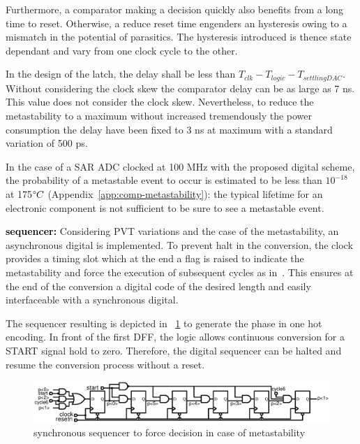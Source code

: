 Furthermore, a comparator making a decision quickly also benefits from a long time to reset. Otherwise, a reduce reset time engenders an hysteresis owing to a mismatch in the potential of parasitics. The hysteresis introduced is thence state dependant and vary from one clock cycle to the other. 

In the design of the latch, the delay shall be less than \(T_{clk} -  T_{logic} - T_{settlingDAC}\). Without considering the clock skew the comparator delay can be as large as 7 ns. This value does not consider the clock skew. Nevertheless, to reduce the metastability to a maximum without increased tremendously the power consumption the delay have been fixed to 3 ns at maximum with a standard variation of 500 ps.

In the case of a SAR ADC clocked at 100 MHz with the proposed digital scheme, the probability of a metastable event to occur is estimated to be less than $10^{-18}$ at 175$\degree C$ (Appendix~\ref{app:comp-metastability}): the typical lifetime for an electronic component is not sufficient to be sure to see a metastable event.

\textbf{\textcolor{black}{sequencer:}}
Considering PVT variations and the case of the metastability, an asynchronous digital is implemented. To prevent halt in the conversion, the clock provides a timing slot which at the end a flag is raised to indicate the metastability and force the execution of subsequent cycles as in~\cite{Tung2016}. This ensures at the end of the conversion a digital code of the desired length and easily interfaceable with a synchronous digital.

The sequencer resulting is depicted in \figurename~\ref{fig:sar-async-sequencer} to generate the phase in one hot encoding. In front of the first DFF, the logic allows continuous conversion for a START signal hold to zero. Therefore, the digital sequencer can be halted and resume the conversion process without a reset.

\begin{figure}[htp]
	\centering
	\includegraphics[width=\textwidth]{Chapter4/Figs/sar-sequencer.ps}
	\caption{synchronous sequencer to force decision in case of metastability}
	\label{fig:sar-async-sequencer}
\end{figure}

